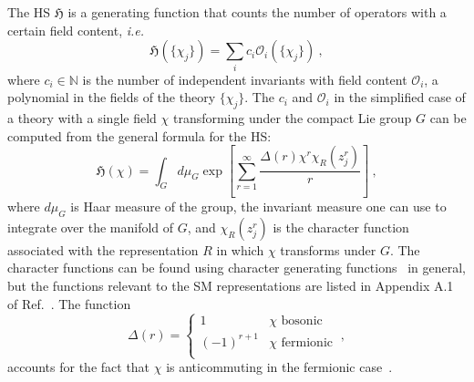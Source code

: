 The HS $\mathfrak{H}$ is a generating function that counts the number of
operators with a certain field content, \textit{i.e.}
\begin{equation}
  \mathfrak{H}(\{\chi_{j}\}) = \sum_{i} c_{i} \mathcal{O}_{i}(\{\chi_{j}\}) \ ,
\end{equation}
where $c_{i} \in \mathbb{N}$ is the number of independent invariants with field
content $\mathcal{O}_{i}$, a polynomial in the fields of the theory
$\{\chi_{j}\}$. The $c_{i}$ and $\mathcal{O}_{i}$ in the simplified case of a
theory with a single field $\chi$ transforming under the compact Lie group $G$
can be computed from the general formula for the HS:
\begin{equation}
  \label{eq:ch1-hs-g}
  \mathfrak{H}(\chi) = \int_{G} d\mu_{G} \exp \left[ \sum_{r=1}^{\infty} \frac{\Delta(r) \chi^{r} \chi_{R}(z_{j}^{r})}{r} \right] \ ,
\end{equation}
where $d\mu_{G}$ is Haar measure of the group, the invariant measure one can use
to integrate over the manifold of $G$, and $\chi_{R}(z_{j}^{r})$ is the
character function associated with the representation $R$ in which $\chi$
transforms under $G$. The character functions can be found using character
generating functions~\cite{Hanany:2014dia} in general, but the functions
relevant to the SM representations are listed in Appendix A.1 of
Ref.~\cite{Lehman:2015via}. The function
\begin{equation}
  \Delta(r) = \begin{cases}
    1 & \text{$\chi$ bosonic} \\
    (-1)^{r+1} & \text{$\chi$ fermionic} \\
  \end{cases} \ ,
\end{equation}
accounts for the fact that $\chi$ is anticommuting in the fermionic
case~\cite{Hanany:2014dia}.

